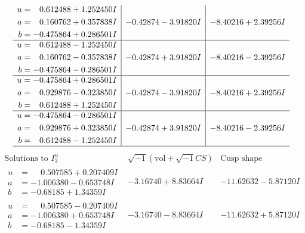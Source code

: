 \documentclass[1p]{elsarticle_modified}
\theoremstyle{definition}
\newcommand{\I}{\sqrt{-1}}
\begin{document}
$$\begin{array}{c|c|c}
\begin{aligned}
u &= \phantom{-}0.612488 + 1.252450 I \\
a &= \phantom{-}0.160762 + 0.357838 I \\
b &= -0.475864 + 0.286501 I\end{aligned}
 & -0.42874 - 3.91820 I & -8.40216 + 2.39256 I \\ \hline\begin{aligned}
u &= \phantom{-}0.612488 - 1.252450 I \\
a &= \phantom{-}0.160762 - 0.357838 I \\
b &= -0.475864 - 0.286501 I\end{aligned}
 & -0.42874 + 3.91820 I & -8.40216 - 2.39256 I \\ \hline\begin{aligned}
u &= -0.475864 + 0.286501 I \\
a &= \phantom{-}0.929876 - 0.323850 I \\
b &= \phantom{-}0.612488 + 1.252450 I\end{aligned}
 & -0.42874 - 3.91820 I & -8.40216 + 2.39256 I \\ \hline\begin{aligned}
u &= -0.475864 - 0.286501 I \\
a &= \phantom{-}0.929876 + 0.323850 I \\
b &= \phantom{-}0.612488 - 1.252450 I\end{aligned}
 & -0.42874 + 3.91820 I & -8.40216 - 2.39256 I\\
 \hline 
 \end{array}$$\newpage$$\begin{array}{c|c|c}  
\text{Solutions to }I^u_{3}& \I (\text{vol} + \sqrt{-1}CS) & \text{Cusp shape}\\
 \hline 
\begin{aligned}
u &= \phantom{-}0.507585 + 0.207409 I \\
a &= -1.006380 - 0.653748 I \\
b &= -0.68185 + 1.34359 I\end{aligned}
 & -3.16740 + 8.83664 I & -11.62632 - 5.87120 I \\ \hline\begin{aligned}
u &= \phantom{-}0.507585 - 0.207409 I \\
a &= -1.006380 + 0.653748 I \\
b &= -0.68185 - 1.34359 I\end{aligned}
 & -3.16740 - 8.83664 I & -11.62632 + 5.87120 I \\ \hline\begin{aligned}

\end{aligned}
\end{array}$$
\end{document}
